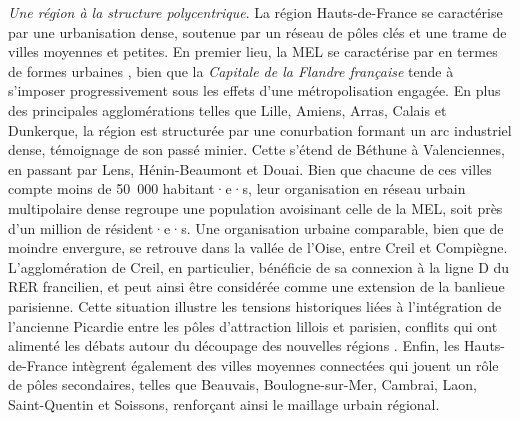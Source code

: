\begin{refsegment}
\textsl{Une région à la structure polycentrique}. La région Hauts-de-France se caractérise par une urbanisation dense, soutenue par un réseau de pôles clés et une trame de villes moyennes et petites. En premier lieu, la \acrshort{MEL} se caractérise par  en termes de formes urbaines \textcolor{blue}{\autocite[37]{mignot_formes_2007}}, bien que la \textsl{Capitale de la Flandre française} tende à s'imposer progressivement sous les effets d'une métropolisation engagée. En plus des principales agglomérations telles que Lille, Amiens, Arras, Calais et Dunkerque, la région est structurée par une \gls{conurbation} formant un arc industriel dense, témoignage de son passé minier. Cette  \textcolor{blue}{\autocite[]{mission_bassin_minier_nord-pas-de-calais_portrait_nodate}} s’étend de Béthune à Valenciennes, en passant par Lens, Hénin-Beaumont et Douai. Bien que chacune de ces villes compte moins de 50~000 habitant·e·s, leur organisation en réseau urbain multipolaire dense regroupe une population avoisinant celle de la \acrshort{MEL}, soit près d’un million de résident·e·s. Une organisation urbaine comparable, bien que de moindre envergure, se retrouve dans la vallée de l’Oise, entre Creil et Compiègne. L’agglomération de Creil, en particulier, bénéficie de sa connexion à la ligne D du \acrfull{RER} francilien, et peut ainsi être considérée comme une extension de la banlieue parisienne. Cette situation illustre les tensions historiques liées à l’intégration de l’ancienne Picardie entre les pôles d’attraction lillois et parisien, conflits qui ont alimenté les débats autour du découpage des nouvelles régions \textcolor{blue}{\autocite[154]{plouvier_questionner_2023}}. Enfin, les Hauts-de-France intègrent également des villes moyennes connectées qui jouent un rôle de pôles secondaires, telles que Beauvais, Boulogne-sur-Mer, Cambrai, Laon, Saint-Quentin et Soissons, renforçant ainsi le maillage urbain régional.%


\end{refsegment}
